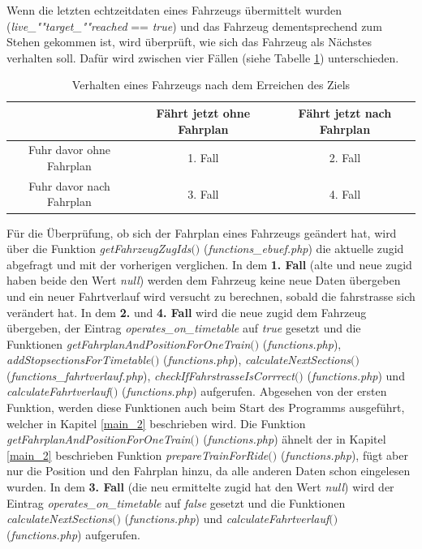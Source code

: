 Wenn die letzten \Gls{echtzeitdaten} eines Fahrzeugs übermittelt wurden (\textit{live\_""target\_""reached} == \textit{true}) und das Fahrzeug dementsprechend zum Stehen gekommen ist, wird überprüft, wie sich das Fahrzeug als Nächstes verhalten soll. Dafür wird zwischen vier Fällen (siehe Tabelle \ref{table:vierfaelle}) unterschieden.
\begin{table}
\begin{center}
\renewcommand{\arraystretch}{1.2}
\begin{tabular}{c|c|c}
 & Fährt jetzt ohne Fahrplan & Fährt jetzt nach Fahrplan \\ \hline
Fuhr davor ohne Fahrplan                 		&    1. Fall         & 2. Fall       \\ \hline
Fuhr davor nach Fahrplan                   		&    3. Fall         & 4. Fall       \\ 
\end{tabular}
\renewcommand{\arraystretch}{1}
\caption{Verhalten eines Fahrzeugs nach dem Erreichen des Ziels}
\label{table:vierfaelle}
\end{center}
\end{table}
Für die Überprüfung, ob sich der Fahrplan eines Fahrzeugs geändert hat, wird über die Funktion \textit{getFahrzeugZugIds$($$)$} (\textit{functions\_ebuef.php}) die aktuelle \Gls{zugid} abgefragt und mit der vorherigen verglichen. In dem \textbf{1. Fall} (alte und neue \Gls{zugid} haben beide den Wert \textit{null}) werden dem Fahrzeug keine neue Daten übergeben und ein neuer Fahrtverlauf wird versucht zu berechnen, sobald die \Gls{fahrstrasse} sich verändert hat. In dem \textbf{2.} und \textbf{4. Fall} wird die neue \Gls{zugid} dem Fahrzeug übergeben, der Eintrag \textit{operates\_on\_time\-table} auf \textit{true} gesetzt und die Funktionen \textit{get\-Fahr\-plan\-And\-Po\-sition\-For\-One\-Train$($$)$} (\textit{func\-tions.php}), \textit{add\-Stop\-sections\-For\-Time\-table$($$)$} (\textit{func\-tions.php}), \textit{calculate\-Next\-Sec\-tions$($$)$} (\textit{func\-tions\_fahrtverlauf.php}), \textit{check\-If\-Fahrstrasse\-Is\-Corrrect$($$)$} (\textit{func\-tions.php}) und \textit{calculate\-Fahrt\-ver\-lauf$($$)$} (\textit{func\-tions\-.php}) aufgerufen. Abgesehen von der ersten Funktion, werden diese Funktionen auch beim Start des Programms ausgeführt, welcher in Kapitel \ref{main_2} beschrieben wird. Die Funktion \textit{get\-Fahrplan\-And\-Position\-For\-One\-Train$($$)$} (\textit{func\-tions.php}) ähnelt der in Kapitel \ref{main_2} beschrieben Funktion \textit{pre\-pare\-Train\-For\-Ride$($$)$} (\textit{func\-tions.php}), fügt aber nur die Position und den Fahrplan hinzu, da alle anderen Daten schon eingelesen wurden. In dem \textbf{3. Fall} (die neu ermittelte \Gls{zugid} hat den Wert \textit{null}) wird der Eintrag \textit{operates\_on\_timetable} auf \textit{false} gesetzt und die Funktionen \textit{cal\-cu\-late\-Next\-Sec\-tions$($$)$} (\textit{func\-tions.php}) und \textit{cal\-cu\-late\-Fahrt\-ver\-lauf$($$)$} (\textit{func\-tions.php}) aufgerufen.

